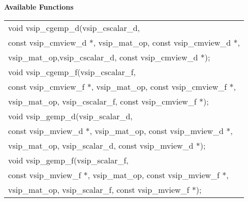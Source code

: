 \\\cvsiplh
\\ \hspace*{.8cm} \vspace*{.1cm} \textbf{Available Functions }
\\ \hspace*{0.03\textwidth} {
\ttfamily
\begin{tabular}[H]{l}
void vsip\_cgemp\_d(vsip\_cscalar\_d,\\*\hspace{.6cm}const vsip\_cmview\_d *, vsip\_mat\_op, const vsip\_cmview\_d *,\\*\hspace{.6cm}vsip\_mat\_op,vsip\_cscalar\_d, const vsip\_cmview\_d *);\\
void vsip\_cgemp\_f(vsip\_cscalar\_f,\\*\hspace{.6cm}const vsip\_cmview\_f *, vsip\_mat\_op, const vsip\_cmview\_f *,\\*\hspace{.6cm}vsip\_mat\_op, vsip\_cscalar\_f, const vsip\_cmview\_f *);\\
void vsip\_gemp\_d(vsip\_scalar\_d,\\*\hspace{.6cm}const vsip\_mview\_d *, vsip\_mat\_op, const vsip\_mview\_d *,\\*\hspace{.6cm}vsip\_mat\_op, vsip\_scalar\_d, const vsip\_mview\_d *);\\
void vsip\_gemp\_f(vsip\_scalar\_f,\\*\hspace{.6cm}const vsip\_mview\_f *, vsip\_mat\_op, const vsip\_mview\_f *,\\*\hspace{.6cm}vsip\_mat\_op, vsip\_scalar\_f, const vsip\_mview\_f *);\\
\end{tabular}
}
\\\pyjvsiph
{}
